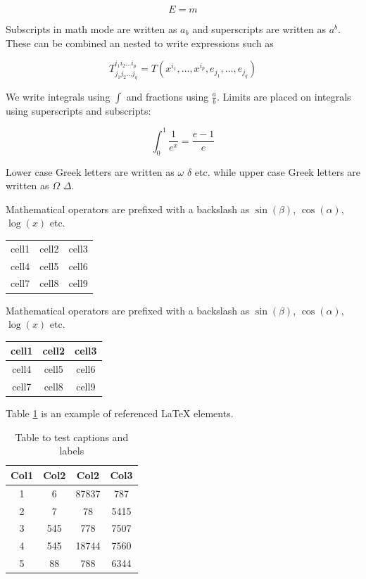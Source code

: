 \documentclass[12pt, a4paper]{article}
\begin{document}
\begin{equation}
E=m
\end{equation}

Subscripts in math mode are written as $a_b$ and superscripts are written as $a^b$. These can be combined an nested to write expressions such as

$$T_{j_1 j_2 \dots j_q}^{i_1 i_2 \dots i_p} =
T(x^{i_1}, \dots, x^{i_p}, e_{j_1}, \dots, e_{j_q})$$

We write integrals using $\int$ and fractions using $\frac{a}{b}$. Limits are placed on integrals using superscripts and subscripts:

$$\int_0^1 \frac{1}{e^x} = \frac{e-1}{e}$$

Lower case Greek letters are written as $\omega$ $\delta$ etc. while upper case Greek letters are written as $\Omega$ $\Delta$.

Mathematical operators are prefixed with a backslash as $\sin(\beta)$, $\cos(\alpha)$, $\log(x)$ etc.

\begin{center}
\begin{tabular}{ c c c }
 cell1 & cell2 & cell3 \\
 cell4 & cell5 & cell6 \\
 cell7 & cell8 & cell9
\end{tabular}
\end{center}
Mathematical operators are prefixed with a backslash as $\sin(\beta)$, $\cos(\alpha)$, $\log(x)$ etc.
\begin{center}
\begin{tabular}{ |c|c|c| }
 cell1 & cell2 & cell3 \\
 \hline
 cell4 & cell5 & cell6 \\
 \hline
 cell7 & cell8 & cell9
\end{tabular}
\end{center}

Table \ref{table:data} is an example of referenced \LaTeX{} elements.

\begin{table}[h!]
\centering
\begin{tabular}{||c c c c||}
 \hline
 Col1 & Col2 & Col2 & Col3 \\ [0.5ex]
 \hline\hline
 1 & 6 & 87837 & 787 \\
 2 & 7 & 78 & 5415 \\
 3 & 545 & 778 & 7507 \\
 4 & 545 & 18744 & 7560 \\
 5 & 88 & 788 & 6344 \\ [1ex]
 \hline
\end{tabular}
\caption{Table to test captions and labels}
\label{table:data}
\end{table}
\end{document}
